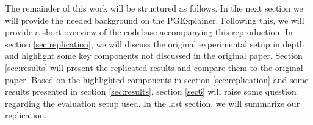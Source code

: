 The remainder of this work will be structured as follows. In the next section we will provide the needed background on the PGExplainer. Following this, we will provide a short overview of the codebase accompanying this reproduction. In section \ref{sec:replication}, we will discuss the original experimental setup in depth and highlight some key components not discussed in the original paper. Section \ref{sec:results} will present the replicated results and compare them to the original paper. Based on the highlighted components in section \ref{sec:replication} and some results presented in section \ref{sec:results}, section \ref{sec6} will raise some question regarding the evaluation setup used. In the last section, we will summarize our replication. 














